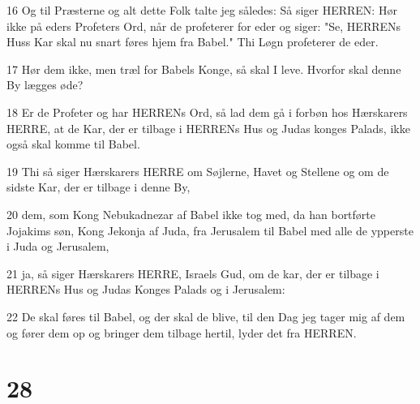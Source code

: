 \par 16 Og til Præsterne og alt dette Folk talte jeg således: Så siger HERREN: Hør ikke på eders Profeters Ord, når de profeterer for eder og siger: "Se, HERRENs Huss Kar skal nu snart føres hjem fra Babel." Thi Løgn profeterer de eder.
\par 17 Hør dem ikke, men træl for Babels Konge, så skal I leve. Hvorfor skal denne By lægges øde?
\par 18 Er de Profeter og har HERRENs Ord, så lad dem gå i forbøn hos Hærskarers HERRE, at de Kar, der er tilbage i HERRENs Hus og Judas konges Palads, ikke også skal komme til Babel.
\par 19 Thi så siger Hærskarers HERRE om Søjlerne, Havet og Stellene og om de sidste Kar, der er tilbage i denne By,
\par 20 dem, som Kong Nebukadnezar af Babel ikke tog med, da han bortførte Jojakims søn, Kong Jekonja af Juda, fra Jerusalem til Babel med alle de ypperste i Juda og Jerusalem,
\par 21 ja, så siger Hærskarers HERRE, Israels Gud, om de kar, der er tilbage i HERRENs Hus og Judas Konges Palads og i Jerusalem:
\par 22 De skal føres til Babel, og der skal de blive, til den Dag jeg tager mig af dem og fører dem op og bringer dem tilbage hertil, lyder det fra HERREN.

\chapter{28}

